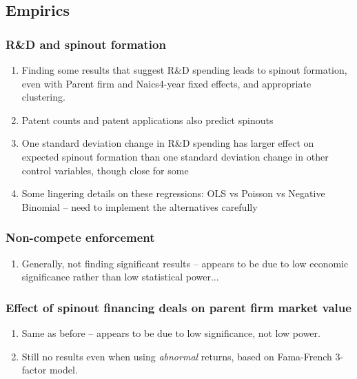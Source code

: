 \documentclass[12pt,english]{article}
\theoremstyle{remark}
\begin{document}
\subsection{Empirics}

\subsubsection{R\&D and spinout formation}

\begin{enumerate}
	\item Finding some results that suggest R\&D spending leads to spinout formation, even with Parent firm and Naics4-year fixed effects, and appropriate clustering. 
	\item Patent counts and patent applications also predict spinouts
	\item One standard deviation change in R\&D spending has larger effect on expected spinout formation than one standard deviation change in other control variables, though close for some
	\item Some lingering details on these regressions: OLS vs Poisson vs Negative Binomial -- need to implement the alternatives carefully
\end{enumerate}

\subsubsection{Non-compete enforcement}

\begin{enumerate}
	\item Generally, not finding significant results -- appears to be due to low economic significance rather than low statistical power...
\end{enumerate}

\subsubsection{Effect of spinout financing deals on parent firm market value}

\begin{enumerate}
	\item Same as before -- appears to be due to low significance, not low power.
	\item Still no results even when using \textit{abnormal} returns, based on Fama-French 3-factor model.
\end{enumerate}
\end{document}
